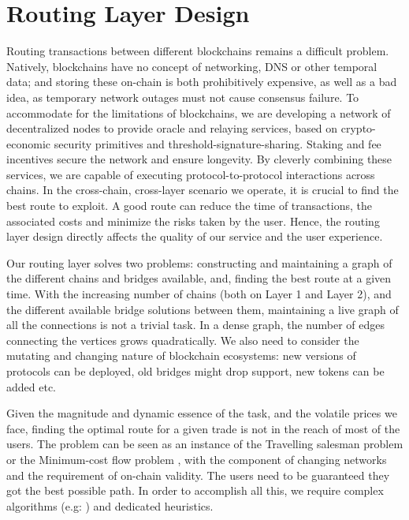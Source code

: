\section{Routing Layer Design\label{sec:routing}}
Routing transactions between different blockchains remains a difficult problem. Natively, blockchains have no concept of networking, DNS or other temporal data; and storing these on-chain is both prohibitively expensive, as well as a bad idea, as temporary network outages must not cause consensus failure. To accommodate for the limitations of blockchains, we are developing a network of decentralized nodes to provide oracle and relaying services, based on crypto-economic security primitives and threshold-signature-sharing. Staking and fee incentives secure the network and ensure longevity. By cleverly combining these services, we are capable of executing protocol-to-protocol interactions across chains. In the cross-chain, cross-layer scenario we operate, it is crucial to find the best route to exploit. A good route can reduce the time of transactions, the associated costs and minimize the risks taken by the user. Hence, the routing layer design directly affects the quality of our service and the user experience. 

Our routing layer solves two problems: constructing and maintaining a graph of the different chains and bridges available, and, finding the best route at a given time. With the increasing number of chains (both on Layer 1 and Layer 2), and the different available bridge solutions between them, maintaining a live graph of all the connections is not a trivial task. In a dense graph, the number of edges connecting the vertices grows quadratically. We also need to consider the mutating and changing nature of blockchain ecosystems: new versions of protocols can be deployed, old bridges might drop support, new tokens can be added etc. 

Given the magnitude and dynamic essence of the task, and the volatile prices we face, finding the optimal route for a given trade is not in the reach of most of the users. The problem can be seen as an instance of the Travelling salesman problem \cite{Gavish1978TheProblems} or the Minimum-cost flow problem \cite{Orlin1988AAlgorithm}, with the component of changing networks and the requirement of on-chain validity. The users need to be guaranteed they got the best possible path. In order to accomplish all this, we require complex algorithms (e.g: \cite{Feigenbaum2005ARouting}) and dedicated heuristics.

